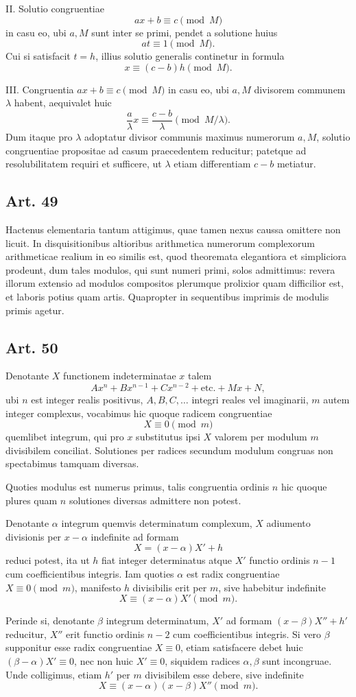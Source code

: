 \documentclass[12pt]{article}
\newcommand{\art}[1]{\subsection*{Art. #1}}
\begin{document}
II. Solutio congruentiae
\[
ax+b\equiv c\pmod M
\]
in casu eo, ubi $a,M$ sunt inter se primi, pendet a solutione huius
\[
at\equiv 1\pmod M.
\]
Cui si satisfacit $t=h$, illius solutio generalis continetur in formula
\[
x\equiv (c-b)h\pmod M.
\]

III. Congruentia $ax+b\equiv c\pmod M$ in casu eo, ubi $a,M$ divisorem communem $\lambda$ habent, aequivalet huic
\[
\frac a\lambda x\equiv \frac{c-b}{\lambda}\pmod{M/\lambda}.
\]
Dum itaque pro $\lambda$ adoptatur divisor communis maximus numerorum $a,M$, solutio congruentiae propositae ad casum praecedentem reducitur; patetque ad resolubilitatem requiri et sufficere, ut $\lambda$ etiam differentiam $c-b$ metiatur.

\art{49}
Hactenus elementaria tantum attigimus, quae tamen nexus caussa omittere non licuit. In disquisitionibus altioribus arithmetica numerorum complexorum arithmeticae realium in eo similis est, quod theoremata elegantiora et simpliciora prodeunt, dum tales modulos, qui sunt numeri primi, solos admittimus: revera illorum extensio ad modulos compositos plerumque prolixior quam difficilior est, et laboris potius quam artis. Quapropter in sequentibus imprimis de modulis primis agetur.

\art{50}
Denotante $X$ functionem indeterminatae $x$ talem
\[
Ax^n+Bx^{n-1}+Cx^{n-2}+\text{etc.}+Mx+N,
\]
ubi $n$ est integer realis positivus, $A,B,C,\ldots$ integri reales vel imaginarii, $m$ autem integer complexus, vocabimus hic quoque radicem congruentiae
\[
X\equiv 0\pmod m
\]
quemlibet integrum, qui pro $x$ substitutus ipsi $X$ valorem per modulum $m$ divisibilem conciliat. Solutiones per radices secundum modulum congruas non spectabimus tamquam diversas.

Quoties modulus est numerus primus, talis congruentia ordinis $n$ hic quoque plures quam $n$ solutiones diversas admittere non potest.

Denotante $\alpha$ integrum quemvis determinatum complexum, $X$ adiumento divisionis per $x-\alpha$ indefinite ad formam
\[
X=(x-\alpha)X'+h
\]
reduci potest, ita ut $h$ fiat integer determinatus atque $X'$ functio ordinis $n-1$ cum coefficientibus integris. Iam quoties $\alpha$ est radix congruentiae $X\equiv0\pmod m$, manifesto $h$ divisibilis erit per $m$, sive habebitur indefinite
\[
X\equiv(x-\alpha)X'\pmod m.
\]

Perinde si, denotante $\beta$ integrum determinatum, $X'$ ad formam $(x-\beta)X''+h'$ reducitur, $X''$ erit functio ordinis $n-2$ cum coefficientibus integris. Si vero $\beta$ supponitur esse radix congruentiae $X\equiv0$, etiam satisfacere debet huic $(\beta-\alpha)X'\equiv0$, nec non huic $X'\equiv0$, siquidem radices $\alpha,\beta$ sunt incongruae. Unde colligimus, etiam $h'$ per $m$ divisibilem esse debere, sive indefinite
\[
X\equiv (x-\alpha)(x-\beta)X''\pmod m.
\]
\end{document}
